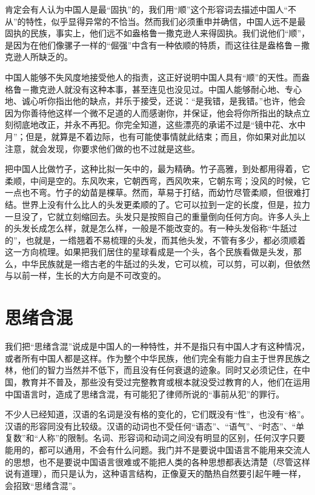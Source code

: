 \documentclass[12pt,oneside]{book}
\begin{document}
\begin{common-format}
肯定会有人认为中国人是最“固执”的，我们用“顺”这个形容词去描述中国人“不从”的特性，似乎显得异常的不恰当。然而我们必须重申并确信，中国人远不是最固执的民族，事实上，他们远不如盎格鲁一撒克逊人来得固执。我们说他们“顺”，是因为在他们像骡子一样的“倔强”中含有一种依顺的特质，而这往往是盎格鲁－撒克逊人所缺乏的。 

中国人能够不失风度地接受他人的指责，这正好说明中国人具有“顺”的天性。而盎格鲁－撒克逊人就没有这种本事，甚至连见也没见过。中国人能够耐心地、专心地、诚心听你指出他的缺点，并乐于接受，还说：“是我错，是我错。”也许，他会因为你善待他这样一个微不足道的人而感谢你，并保证，他会将你所指出的缺点立刻彻底地改正，并永不再犯。你完全知道，这些漂亮的承诺不过是“镜中花、水中月”；但是，就算是不着边际，也有可能使事情就此结束；而且，你如果对此加以注意，就会发现，你要求他们做的也不过就是这些。 

把中国人比做竹子，这种比拟一矢中的，最为精确。竹子高雅，到处都用得着，它柔顺，中间是空的。东风吹来，它朝西弯，西风吹来，它朝东弯；没风的时候，它一点也不弯。竹子的幼苗是棵草。然而，草易于打结，而幼竹尽管柔顺，但很难打结。世界上没有什么比人的头发更柔顺的了。它可以拉到一定的长度，但是，拉力一旦没了，它就立刻缩回去。头发只是按照自己的重量倒向任何方向。许多人头上的头发长成怎么样，就是怎么样，一般是不能改变的。有一种头发俗称“牛舐过的”，也就是，一绺翘着不易梳理的头发，而其他头发，不管有多少，都必须顺着这一方向梳理。如果把我们居住的星球看成是一个头，各个民族看做是头发，那么，中华民族就是一绺古老的牛舐过的头发，它可以梳，可以剪，可以剃，但依然与以前一样，生长的大方向是不可改变的。

\chapter{思绪含混}
我们把“思绪含混”说成是中国人的一种特性，并不是指只有中国人才有这种情况，或者所有中国人都是这样。作为整个中华民族，他们完全有能力自主于世界民族之林，他们的智力当然并不低下，而且没有任何衰退的迹象。同时又必须记住，在中国，教育并不普及，那些没有受过完整教育或根本就没受过教育的人，他们在运用中国语言时，造成了思绪含混，有可能犯了律师所说的“事前从犯”的罪行。 

不少人已经知道，汉语的名词是没有格的变化的，它们既没有“性”，也没有“格”。汉语的形容同没有比较级。汉语的动词也不受任何“语态”、“语气”、“时态”、“单复数”和“人称”的限制。名词、形容词和动词之间没有明显的区别，任何汉字只要能用的，都可以通用，不会有什么问题。我门并不是要说中国语言不能用来交流人的思想，也不是要说中国语言很难或不能把人类的各种思想都表达清楚（尽管这样说有道理），而只是认为，这种语言结构，正像夏天的酷热自然要引起午睡一样，会招致“思绪含混”。 


\end{common-format}
\end{document}
